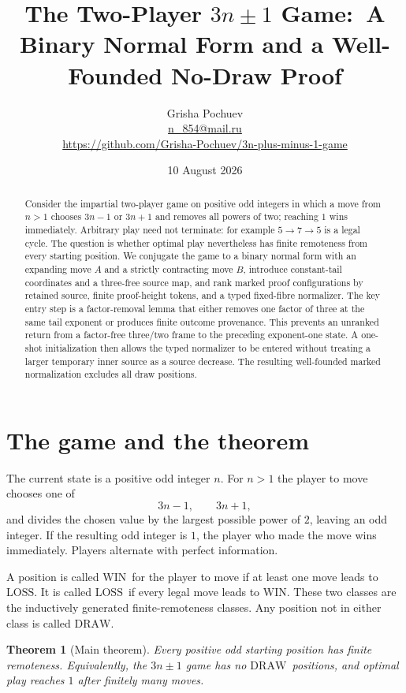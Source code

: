 \documentclass[11pt]{article}
\title{The Two-Player $3n\mathbin{\pm}1$ Game:\
A Binary Normal Form and a Well-Founded No-Draw Proof}
\author{Grisha Pochuev\\
  \small\href{mailto:n_854@mail.ru}{n\_854@mail.ru}\\
  \small\url{https://github.com/Grisha-Pochuev/3n-plus-minus-1-game}}
\date{10 August 2026}
\newtheorem{theorem}{Theorem}[section]
\newcommand{\WIN}{\ensuremath{\mathrm{WIN}}}
\newcommand{\LOSS}{\ensuremath{\mathrm{LOSS}}}
\newcommand{\DRAW}{\ensuremath{\mathrm{DRAW}}}
\begin{document}
\maketitle

\begin{abstract}
Consider the impartial two-player game on positive odd integers in which a
move from $n>1$ chooses $3n-1$ or $3n+1$ and removes all powers of two; reaching
$1$ wins immediately. Arbitrary play need not terminate: for example
$5\to 7\to 5$ is a legal cycle. The question is whether optimal play nevertheless
has finite remoteness from every starting position. We conjugate the game to a
binary normal form with an expanding move $A$ and a strictly contracting move
$B$, introduce constant-tail coordinates and a three-free source map, and rank
marked proof configurations by retained source, finite proof-height tokens, and
a typed fixed-fibre normalizer. The key entry step is a factor-removal lemma
that either removes one factor of three at the same tail exponent or produces
finite outcome provenance. This prevents an unranked return from a factor-free
three/two frame to the preceding exponent-one state. A one-shot initialization
then allows the typed normalizer to be entered without treating a larger
temporary inner source as a source decrease. The resulting well-founded marked
normalization excludes all draw positions.
\end{abstract}

\tableofcontents

\section{The game and the theorem}

The current state is a positive odd integer $n$. For $n>1$ the player to move
chooses one of
\[
  3n-1,\qquad 3n+1,
\]
and divides the chosen value by the largest possible power of $2$, leaving an
odd integer. If the resulting odd integer is $1$, the player who made the move
wins immediately. Players alternate with perfect information.

A position is called \WIN\ for the player to move if at least one move leads to
\LOSS. It is called \LOSS\ if every legal move leads to \WIN. These two classes
are the inductively generated finite-remoteness classes. Any position not in
either class is called \DRAW.

\begin{theorem}[Main theorem]\label{thm:main}
Every positive odd starting position has finite remoteness. Equivalently, the
$3n\pm1$ game has no \DRAW\ positions, and optimal play reaches $1$ after
finitely many moves.
\end{theorem}
\end{document}
